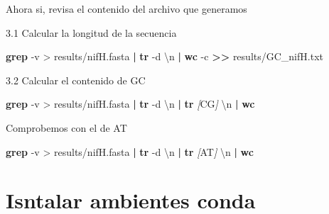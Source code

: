 \documentclass[
]{book}
\newenvironment{Shaded}{\begin{snugshade}}{\end{snugshade}}
\newcommand{\AttributeTok}[1]{\textcolor[rgb]{0.13,0.29,0.53}{#1}}
\newcommand{\FunctionTok}[1]{\textcolor[rgb]{0.13,0.29,0.53}{\textbf{#1}}}
\newcommand{\KeywordTok}[1]{\textcolor[rgb]{0.13,0.29,0.53}{\textbf{#1}}}
\newcommand{\NormalTok}[1]{#1}
\newcommand{\OperatorTok}[1]{\textcolor[rgb]{0.81,0.36,0.00}{\textbf{#1}}}
\newcommand{\PreprocessorTok}[1]{\textcolor[rgb]{0.56,0.35,0.01}{\textit{#1}}}
\newcommand{\SpecialStringTok}[1]{\textcolor[rgb]{0.31,0.60,0.02}{#1}}
\newcommand{\StringTok}[1]{\textcolor[rgb]{0.31,0.60,0.02}{#1}}
\begin{document}
Ahora si, revisa el contenido del archivo que generamos

3.1 Calcular la longitud de la secuencia

\begin{Shaded}
\begin{Highlighting}[]
\FunctionTok{grep} \AttributeTok{{-}v} \StringTok{\textquotesingle{}\textgreater{}\textquotesingle{}}\NormalTok{ results/nifH.fasta }\KeywordTok{|} \FunctionTok{tr} \AttributeTok{{-}d} \StringTok{\textquotesingle{}\textbackslash{}n\textquotesingle{}} \KeywordTok{|} \FunctionTok{wc} \AttributeTok{{-}c} \OperatorTok{\textgreater{}\textgreater{}}\NormalTok{ results/GC\_nifH.txt}
\end{Highlighting}
\end{Shaded}

3.2 Calcular el contenido de GC

\begin{Shaded}
\begin{Highlighting}[]
\FunctionTok{grep} \AttributeTok{{-}v} \StringTok{\textquotesingle{}\textgreater{}\textquotesingle{}}\NormalTok{ results/nifH.fasta }\KeywordTok{|} \FunctionTok{tr} \AttributeTok{{-}d} \StringTok{\textquotesingle{}\textbackslash{}n\textquotesingle{}} \KeywordTok{|} \FunctionTok{tr} \PreprocessorTok{[}\SpecialStringTok{CG}\PreprocessorTok{]} \StringTok{\textquotesingle{}\textbackslash{}n\textquotesingle{}} \KeywordTok{|} \FunctionTok{wc}
\end{Highlighting}
\end{Shaded}

Comprobemos con el de AT

\begin{Shaded}
\begin{Highlighting}[]
\FunctionTok{grep} \AttributeTok{{-}v} \StringTok{\textquotesingle{}\textgreater{}\textquotesingle{}}\NormalTok{ results/nifH.fasta }\KeywordTok{|} \FunctionTok{tr} \AttributeTok{{-}d} \StringTok{\textquotesingle{}\textbackslash{}n\textquotesingle{}} \KeywordTok{|} \FunctionTok{tr} \PreprocessorTok{[}\SpecialStringTok{AT}\PreprocessorTok{]} \StringTok{\textquotesingle{}\textbackslash{}n\textquotesingle{}} \KeywordTok{|} \FunctionTok{wc}
\end{Highlighting}
\end{Shaded}

\section{Isntalar ambientes conda}\label{isntalar-ambientes-conda}
\end{document}
